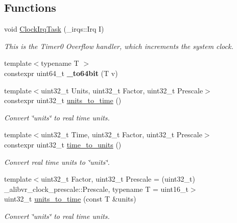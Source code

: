 \subsection*{Functions}
\begin{DoxyCompactItemize}
\item 
void \hyperlink{namespaceclock_aa67adb0b2215c44a4a770b6c36cfe8a7}{Clock\+Irq\+Task} (\+\_\+irqs\+::\+Irq I)
\begin{DoxyCompactList}\small\item\em This is the Timer0 Overflow handler, which increments the system clock. \end{DoxyCompactList}\item 
\hypertarget{namespaceclock_ac68f79977567f2ffe11ea30631653dd8}{}\label{namespaceclock_ac68f79977567f2ffe11ea30631653dd8} 
{\footnotesize template$<$typename T $>$ }\\constexpr uint64\+\_\+t {\bfseries \+\_\+to64bit} (T v)
\item 
{\footnotesize template$<$uint32\+\_\+t Units, uint32\+\_\+t Factor, uint32\+\_\+t Prescale$>$ }\\constexpr uint32\+\_\+t \hyperlink{namespaceclock_ae4ee0d04356b216b1d04046c0e1b2d38}{units\+\_\+to\+\_\+time} ()
\begin{DoxyCompactList}\small\item\em Convert \char`\"{}units\char`\"{} to real time units. \end{DoxyCompactList}\item 
{\footnotesize template$<$uint32\+\_\+t Time, uint32\+\_\+t Factor, uint32\+\_\+t Prescale$>$ }\\constexpr uint32\+\_\+t \hyperlink{namespaceclock_ac6b5f264784ea96fd8629fec0c0f7131}{time\+\_\+to\+\_\+units} ()
\begin{DoxyCompactList}\small\item\em Convert real time units to \char`\"{}units\char`\"{}. \end{DoxyCompactList}\item 
{\footnotesize template$<$uint32\+\_\+t Factor, uint32\+\_\+t Prescale = (uint32\+\_\+t) \+\_\+alibvr\+\_\+clock\+\_\+prescale\+::\+Prescale, typename T  = uint16\+\_\+t$>$ }\\uint32\+\_\+t \hyperlink{namespaceclock_afadc978b0b25983f61b85b53ae468a51}{units\+\_\+to\+\_\+time} (const T \&units)
\begin{DoxyCompactList}\small\item\em Convert \char`\"{}units\char`\"{} to real time units. \end{DoxyCompactList}\item 

\end{DoxyCompactItemize}

